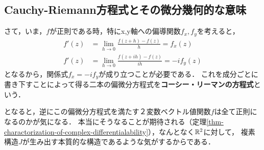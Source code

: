 \documentclass[uplatex, dvipdfmx]{jsreport}
\begin{document}
\subsection{Cauchy-Riemann方程式とその微分幾何的な意味}

\begin{discussion}[複素微分可能であるために追加で必要な条件]
    さて，いま，$f$が正則である時，特にx,y軸への偏導関数$f_x,f_y$を考えると，
    \begin{align*}
        f'(z) &= \lim_{h\to 0}\frac{f(z+h)-f(z)}{h} =f_x(z) \\
        f'(z) &= \lim_{h\to 0}\frac{f(z+ih)-f(z)}{ih} =-if_y(z)
    \end{align*}
    となるから，関係式$f_x=-if_y$が成り立つことが必要である．
    これを成分ごとに書き下すことによって得る二本の偏微分方程式を\textbf{コーシー・リーマンの方程式}という．

    となると，逆にこの偏微分方程式を満たす２変数ベクトル値関数$f$は全て正則になるのかが気になる．
    本当にそうなることが期待される（定理\ref{thm-charactorization-of-complex-differentialability}），なんとなく$\mathbb{R}^2$に対して，
    複素構造$J$が生み出す本質的な構造であるような気がするからである．
\end{discussion}
\end{document}
